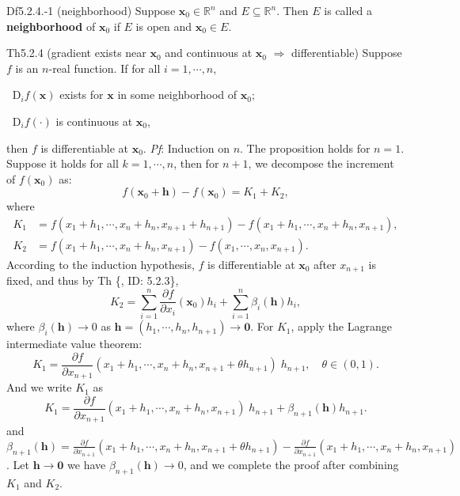 \documentclass{article}
\newcommand{\parfrac}[2]{\frac{\partial #1}{\partial #2}}
\newcommand{\Dif}{\mathop{}\!\mathrm{D}}
\begin{document}
\begin{Df}{Df5.2.4.-1 (neighborhood)}
    Suppose $\pmb{x}_0\in\mathbb{R}^n$ and $E\subseteq\mathbb{R}^n$. Then $E$ is called a \textbf{neighborhood} of $\pmb{x}_0$ if $E$ is open and $\pmb{x}_0\in E$.
\end{Df}

\begin{Th}{Th5.2.4 (gradient exists near $\pmb{x}_0$ and continuous at $\pmb{x}_0$ $\Rightarrow$ differentiable)}
    Suppose $f$ is an $n$-real function. If for all $i=1,\cdots,n$, 
    \begin{compactenum}
        \item $\Dif_i f(\pmb{x})$ exists for $\pmb{x}$ in some neighborhood of $\pmb{x}_0$;
        \item $\Dif_i f(\cdot)$ is continuous at $\pmb{x}_0$,
    \end{compactenum}
    then $f$ is differentiable at $\pmb{x}_0$.
    \tcblower
    \textit{Pf}: Induction on $n$. The proposition holds for $n=1$. Suppose it holds for all $k=1,\cdots, n$, then for $n+1$, we decompose the increment of $f(\pmb{x}_0)$ as:
    $$ f(\pmb{x}_0 + \pmb{h}) - f(\pmb{x}_0) = K_1 + K_2, $$
    where
    $$
    \begin{aligned}
    K_1 &= f(x_1+h_1, \cdots, x_n+h_n, x_{n+1} + h_{n+1}) - f(x_1+h_1, \cdots, x_n+h_n, x_{n+1}),\\
    K_2 &= f(x_1+h_1, \cdots, x_n+h_n, x_{n+1}) - f(x_1, \cdots, x_n, x_{n+1}).
    \end{aligned}
    $$
    According to the induction hypothesis, $f$ is differentiable at $\pmb{x}_0$ after $x_{n+1}$ is fixed, and thus by Th \{, ID: 5.2.3\}, 
    $$ K_2 = \sum_{i=1}^{n} \parfrac{f}{x_i}(\pmb{x}_0)h_i + \sum_{i=1}^{n} \beta_i (\pmb{h}) h_i, $$
    where $\beta_i(\pmb{h})\rightarrow 0$ as $\pmb{h} = (h_1, \cdots, h_n, h_{n+1})\rightarrow \pmb{0}$.
    For $K_1$, apply the Lagrange intermediate value theorem:
    $$ K_1 = \parfrac{f}{x_{n+1}}(x_1+h_1, \cdots, x_n+h_n, x_{n+1}+\theta h_{n+1})\;h_{n+1},\quad\theta\in (0,1).$$
    And we write $K_1$ as
    $$ K_1 = \parfrac{f}{x_{n+1}}(x_1+h_1, \cdots, x_n+h_n, x_{n+1})\;h_{n+1} + \beta_{n+1}(\pmb{h}) h_{n+1}. $$
    and 
    $\beta_{n+1}(\pmb{h}) = \parfrac{f}{x_{n+1}}(x_1+h_1, \cdots, x_n+h_n, x_{n+1}+\theta h_{n+1}) - \parfrac{f}{x_{n+1}}(x_1+h_1, \cdots, x_n+h_n, x_{n+1})$.
    Let $\pmb{h}\rightarrow \pmb{0}$ we have $\beta_{n+1}(\pmb{h})\rightarrow 0$, and we complete the proof after combining $K_1$ and $K_2$.
\end{Th}
\end{document}
